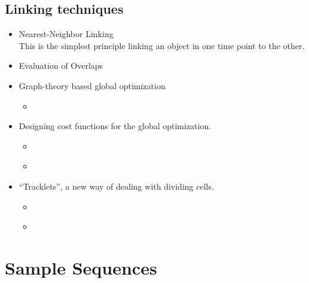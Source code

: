 \documentclass[11pnt]{article}
\begin{document}
\subsection{Linking techniques}

\begin{itemize}
	\item Nearest-Neighbor Linking\\
	This is the simplest principle linking an object in one time point to the other. 
	\item Evaluation of Overlaps
	\item Graph-theory based global optimization
	\begin{itemize}
		\item \cite{Vallotton2003a}
	\end{itemize}
	\item Designing cost functions for the global optimization. 
	\begin{itemize}
		\item \cite{Sbalzarini2005a}
		\item \cite{Sbalzarini2006a}
	\end{itemize}
	\item ``Tracklets'', a new way of dealing with dividing cells.
	\begin{itemize}
		\item \cite{Jaqaman2009a}
		\item \cite{Bise2011}
	\end{itemize}
\end{itemize}


\section{Sample Sequences}
\end{document}
